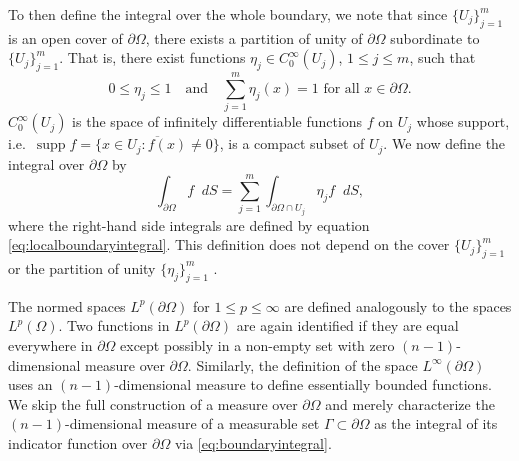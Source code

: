 \documentclass[english, 12pt, a4paper, sci, utf8, a-2b, online]{aaltothesis}
\theoremstyle{definition}
\theoremstyle{plain}
\newcommand*\diff{\mathop{}\!d}
\DeclareMathOperator\supp{supp}
\numberwithin{equation}{section}
\begin{document}
To then define the integral over the whole boundary, we note that since
$\{ U_j \}_{j=1}^{m}$ is an open cover of $\partial \Omega$, there exists
a partition of unity of $\partial \Omega$ subordinate to $\{ U_j \}_{j=1}^{m}$. 
That is, there exist functions $\eta_j \in C_0^{\infty}(U_j)$,
$1 \leq j \leq m$, such that
\begin{equation*}
    0 \leq \eta_j \leq 1
    \quad \text{and} \quad
    \sum_{j=1}^{m} \eta_j(x) = 1 \text{ for all } x \in \partial \Omega.
\end{equation*}
$C_0^{\infty}(U_j)$ is the space of infinitely differentiable functions $f$
on $U_j$ whose support, i.e.\
$\supp f = \overline{\{ x \in U_j : f(x) \neq 0 \}}$,
is a compact subset of $U_j$.
We now define the integral over $\partial \Omega$ by
\begin{equation}
    \label{eq:boundaryintegral}
    \int_{\partial \Omega} f \diff S
    = \sum_{j=1}^{m} \int_{\partial \Omega \cap U_j} \eta_j f \diff S,
\end{equation}
where the right-hand side integrals are defined by
equation \eqref{eq:localboundaryintegral}.
This definition does not depend on the cover $\{ U_j \}_{j=1}^{m}$
or the partition of unity $\{ \eta_j \}_{j=1}^{m}$ \cite{necas2011}.

The normed spaces $L^p(\partial \Omega)$ for $1 \leq p \leq \infty$ are defined
analogously to the spaces $L^p(\Omega)$. Two functions in $L^p(\partial \Omega)$
are again identified if they are equal everywhere in $\partial \Omega$ except
possibly in a non-empty set with zero $(n-1)$-dimensional measure over
$\partial \Omega$. Similarly, the definition of the space $L^{\infty}(\partial 
\Omega)$ uses an $(n-1)$-dimensional measure to define essentially bounded
functions. We skip the full construction of a measure over $\partial \Omega$
and merely characterize the $(n-1)$-dimensional measure of a measurable
set $\Gamma \subset \partial \Omega$ as the integral of its indicator
function over $\partial \Omega$ via \eqref{eq:boundaryintegral}.
\end{document}
